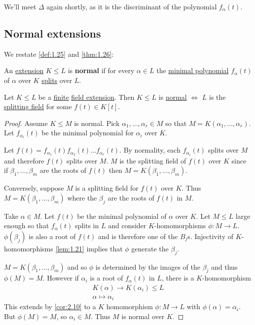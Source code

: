 \documentclass{article}
\newenvironment{manual}[1]{%
    \renewcommand\themanualinner{#1}%
    \manualinner
}{\endmanualinner}
\begin{document}
\begin{remark}
    We'll meet $\Delta$ again shortly, as it is the discriminant of the polynomial $f_\alpha(t)$.
\end{remark}

\subsection{Normal extensions}
We restate \cref{def:1.25} and \cref{thm:1.26}:

\begin{manual}{Definition 1.25}[Normal extension]
    An \hyperlink{def:fieldExt}{extension} $K \leq L$ is \textbf{normal} if for every $\alpha \in L$ the \hyperlink{def:minimalPoly}{minimal polynomial} $f_\alpha(t)$ of $\alpha$ over $K$ \hyperlink{def:splitting}{splits} over $L$.
\end{manual}

\begin{manual}{Theorem 1.26}
    Let $K \leq L$ be a \hyperlink{def:degreeOfFieldExt}{finite} \hyperlink{def:fieldExt}{field extension}. Then $K \leq L$ is \hyperlink{def:normal}{normal} $\iff$ $L$ is the \hyperlink{def:splitting}{splitting field} for some $f(t) \in K[t]$.
\end{manual}

\begin{proof}
    Assume $K \leq M$ is normal. Pick $\alpha_1, \dotsc, \alpha_r \in M$ so that $M = K(\alpha_1, \dotsc, \alpha_r)$.
    Let $f_{\alpha_i}(t)$ be the minimal polynomial for $\alpha_i$ over $K$.

    Let $f(t) = f_{\alpha_1}(t) f_{\alpha_2}(t)  \dotsc f_{\alpha_r}(t)$.
    By normality, each $f_{\alpha_i}(t)$ splits over $M$ and therefore $f(t)$ splits over $M$.
    $M$ is the splitting field of $f(t)$ over $K$ since if $\beta_1, \dotsc, \beta_m$ are the roots of $f(t)$ then $M=K(\beta_1, \dotsc, \beta_m)$.

    Conversely, suppose $M$ is a splitting field for $f(t)$ over $K$. Thus $M= K(\beta_1, \dotsc, \beta_m)$ where the $\beta_j$ are the roots of $f(t)$ in $M$.

    Take $\alpha\in M$. Let $f(t)$ be the minimal polynomial of $\alpha$ over $K$.
    Let $M \leq L$ large enough so that $f_\alpha(t)$ splits in $L$ and consider $K$-homomorphisms $\phi:M \to L$.
    $\phi(\beta_j)$ is also a root of $f(t)$ and is therefore one of the $B_j$s.
    Injectivity of $K$-homomorphisms \cref{lem:1.21} implies that $\phi$ generate the $\beta_j$.

    $M = K(\beta_1, \dotsc, \beta_m)$ and so $\phi$ is determined by the images of the $\beta_j$ and thus $\phi(M) = M$.
    However if $\alpha_i$ is a root of $f_\alpha(t)$ in $L$, there is a $K$-homomorphism
    \begin{align*}
        K(\alpha) \to K(\alpha_i) \leq L \\
        \alpha \mapsto \alpha_i
    \end{align*}
    This extends by \cref{cor:2.10} to a $K$ homomorphism $\phi: M \to L$ with $\phi(\alpha) = \alpha_i$.
    But $\phi(M) = M$, so $\alpha_i \in M$. Thus $M$ is normal over $K$.
\end{proof}
\end{document}
